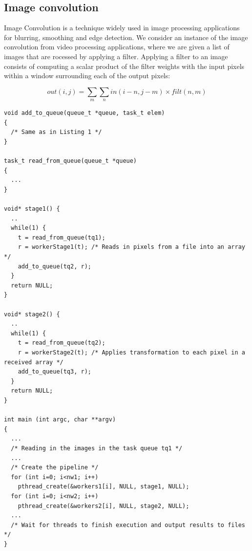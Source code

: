 \subsection{Image convolution}

Image Convolution  is a technique widely used in image processing applications for
blurring, smoothing and edge detection. We consider an instance of the image convolution from video processing applications, where we are given a list of images that are rocessed by applying a filter. Applying a filter to an image consists of computing a scalar product of the filter weights with the input pixels within a window surrounding each of the output pixels:
	
\begin{equation}\label{eqn:01}
\textit{out}(i,j)=\sum_{m}\sum_{n} \textit{in}(i-n,j-m)\times \textit{filt}(n,m)
\end{equation}

\begin{lstlisting}[label=convo0, caption={Original Convolution with PThreads}, frame=single]
void add_to_queue(queue_t *queue, task_t elem)
{
  /* Same as in Listing 1 */
}
  
task_t read_from_queue(queue_t *queue)
{
  ...
}

void* stage1() {
  ..
  while(1) {
    t = read_from_queue(tq1);
    r = workerStage1(t); /* Reads in pixels from a file into an array */
    add_to_queue(tq2, r);
  }
  return NULL;
}

void* stage2() {
  ..
  while(1) {
    t = read_from_queue(tq2);
    r = workerStage2(t); /* Applies transformation to each pixel in a received array */
    add_to_queue(tq3, r);
  }
  return NULL;
}

int main (int argc, char **argv)
{
  ... 
  /* Reading in the images in the task queue tq1 */
  ...
  /* Create the pipeline */
  for (int i=0; i<nw1; i++)
    pthread_create(&workers1[i], NULL, stage1, NULL);
  for (int i=0; i<nw2; i++)
    pthread_create(&workers2[i], NULL, stage2, NULL);
  ...
  /* Wait for threads to finish execution and output results to files */    
}

\end{lstlisting}

%

